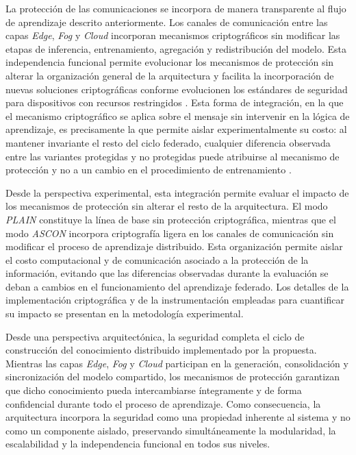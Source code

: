 \documentclass[journal,article,submit,moreauthors]{Definitions/mdpi}
\begin{document}
La protección de las comunicaciones se incorpora de manera transparente al flujo de aprendizaje descrito anteriormente. Los canales de comunicación entre las capas \textit{Edge}, \textit{Fog} y \textit{Cloud} incorporan mecanismos criptográficos sin modificar las etapas de inferencia, entrenamiento, agregación y redistribución del modelo. Esta independencia funcional permite evolucionar los mecanismos de protección sin alterar la organización general de la arquitectura y facilita la incorporación de nuevas soluciones criptográficas conforme evolucionen los estándares de seguridad para dispositivos con recursos restringidos \cite{NIST800232,Kaur2025}. Esta forma de integración, en la que el mecanismo criptográfico se aplica sobre el mensaje sin intervenir en la lógica de aprendizaje, es precisamente la que permite aislar experimentalmente su costo: al mantener invariante el resto del ciclo federado, cualquier diferencia observada entre las variantes protegidas y no protegidas puede atribuirse al mecanismo de protección y no a un cambio en el procedimiento de entrenamiento \cite{Alshammari2026,Sorescu2025}.

Desde la perspectiva experimental, esta integración permite evaluar el impacto de los mecanismos de protección sin alterar el resto de la arquitectura. El modo \textit{PLAIN} constituye la línea de base sin protección criptográfica, mientras que el modo \textit{ASCON} incorpora criptografía ligera en los canales de comunicación sin modificar el proceso de aprendizaje distribuido. Esta organización permite aislar el costo computacional y de comunicación asociado a la protección de la información, evitando que las diferencias observadas durante la evaluación se deban a cambios en el funcionamiento del aprendizaje federado. Los detalles de la implementación criptográfica y de la instrumentación empleadas para cuantificar su impacto se presentan en la metodología experimental.

Desde una perspectiva arquitectónica, la seguridad completa el ciclo de construcción del conocimiento distribuido implementado por la propuesta. Mientras las capas \textit{Edge}, \textit{Fog} y \textit{Cloud} participan en la generación, consolidación y sincronización del modelo compartido, los mecanismos de protección garantizan que dicho conocimiento pueda intercambiarse íntegramente y de forma confidencial durante todo el proceso de aprendizaje. Como consecuencia, la arquitectura incorpora la seguridad como una propiedad inherente al sistema y no como un componente aislado, preservando simultáneamente la modularidad, la escalabilidad y la independencia funcional en todos sus niveles.
\end{document}
